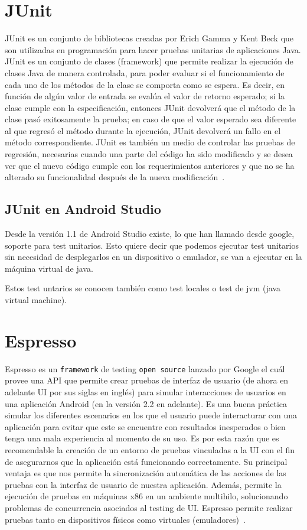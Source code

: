 \section{JUnit}

JUnit es un conjunto de bibliotecas creadas por Erich Gamma y Kent Beck que son utilizadas en programación para hacer pruebas unitarias de aplicaciones Java.
JUnit es un conjunto de clases (framework) que permite realizar la ejecución de clases Java de manera controlada, para poder evaluar si el funcionamiento de cada uno de los métodos de la clase se comporta como se espera. Es decir, en función de algún valor de entrada se evalúa el valor de retorno esperado; si la clase cumple con la especificación, entonces JUnit devolverá que el método de la clase pasó exitosamente la prueba; en caso de que el valor esperado sea diferente al que regresó el método durante la ejecución, JUnit devolverá un fallo en el método correspondiente.
JUnit es también un medio de controlar las pruebas de regresión, necesarias cuando una parte del código ha sido modificado y se desea ver que el nuevo código cumple con los requerimientos anteriores y que no se ha alterado su funcionalidad después de la nueva modificación~\cite{wiki:junit}.
\subsection{JUnit en Android Studio}
Desde la versión 1.1 de Android Studio existe, lo que han llamado desde google, soporte para test unitarios. Esto quiere decir que podemos ejecutar test unitarios sin necesidad de desplegarlos en un dispositivo o emulador, se van a ejecutar en la máquina virtual de java. 

Estos test untarios se conocen también como test locales o test de jvm (java virtual machine). 


\section{Espresso}
Espresso es un \texttt{framework} de testing \texttt{open source} lanzado por Google el cuál provee una API que permite crear pruebas de interfaz de usuario (de ahora en adelante UI por sus siglas en inglés) para simular interacciones de usuarios en una aplicación Android (en la versión 2.2 en adelante). Es una buena práctica simular los diferentes escenarios en los que el usuario puede interacturar con una aplicación para evitar que este se encuentre con resultados inesperados o bien tenga una mala experiencia al momento de su uso. Es por esta razón que es recomendable la creación de un entorno de pruebas vinculadas a la UI con el fin de asegurarnos que la aplicación está funcionando correctamente.
Su principal ventaja es que nos permite la sincronización automática de las acciones de las pruebas con la interfaz de usuario de nuestra aplicación. Además, permite la ejecución de pruebas en máquinas x86 en un ambiente multihilo, solucionando problemas de concurrencia asociados al testing de UI.
Espresso permite realizar pruebas tanto en dispositivos físicos como virtuales (emuladores)~\cite{wiki:espresso}.

